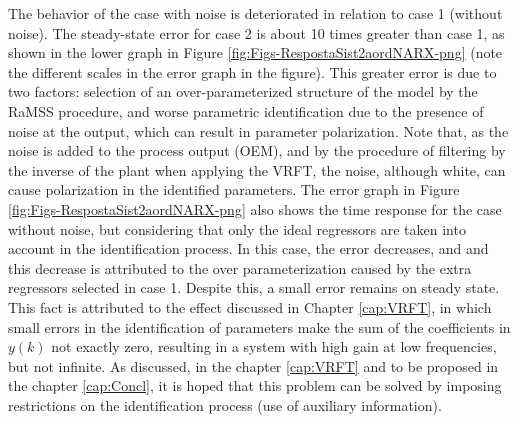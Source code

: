 \begin{exmp}
The behavior of the case with noise is deteriorated in relation to case 1 (without noise). The steady-state error for case 2 is about 10 times greater than case 1, as shown in the lower graph in Figure \ref{fig:Figs-RespostaSist2aordNARX-png} (note the different scales in the error graph in the figure).
This greater error is due to two factors: selection of an over-parameterized structure of the model by the RaMSS procedure, and worse parametric identification due to the presence of noise at the output, which can result in parameter polarization.
Note that, as the noise is added to the process output (OEM), and by the procedure of filtering by the inverse of the plant when applying the VRFT, the noise, although white, can cause polarization in the identified parameters.
The error graph in Figure \ref{fig:Figs-RespostaSist2aordNARX-png} also shows the time response for the case without noise, but considering that only the ideal regressors are taken into account in the identification process.
In this case, the error decreases, and and this decrease is attributed to the over parameterization caused by the extra regressors selected in case 1.
Despite this, a small error remains on steady state. This fact is attributed to the effect discussed in Chapter \ref{cap:VRFT}, in which small errors in the identification of parameters make the sum of the coefficients in $y(k)$ not exactly zero, resulting in a system with high gain at low frequencies, but not infinite. As discussed, in the chapter \ref{cap:VRFT} and to be proposed in the chapter \ref{cap:Concl}, it is hoped that this problem can be solved by imposing restrictions on the identification process (use of auxiliary information).




\end{exmp}




